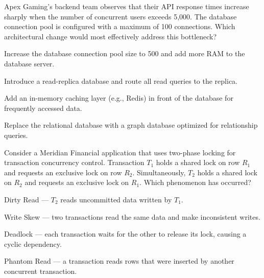 \documentclass[11pt,a4paper]{article}
\begin{document}
\begin{questionblock}
 Apex Gaming's backend team observes that their API response times increase sharply when the number of concurrent users exceeds 5,000. The database connection pool is configured with a maximum of 100 connections. Which architectural change would most effectively address this bottleneck?
\begin{mcoptions}
  \item[\textbf{A.}] Increase the database connection pool size to 500 and add more RAM to the database server.
  \item[\textbf{B.}] Introduce a read-replica database and route all read queries to the replica.
  \item[\textbf{C.}] Add an in-memory caching layer (e.g., Redis) in front of the database for frequently accessed data.
  \item[\textbf{D.}] Replace the relational database with a graph database optimized for relationship queries.
\end{mcoptions}
\end{questionblock}

\begin{questionblock}
 Consider a Meridian Financial application that uses two-phase locking for transaction concurrency control. Transaction $T_1$ holds a shared lock on row $R_1$ and requests an exclusive lock on row $R_2$. Simultaneously, $T_2$ holds a shared lock on $R_2$ and requests an exclusive lock on $R_1$. Which phenomenon has occurred?
\begin{mcoptions}
  \item[\textbf{A.}] Dirty Read --- $T_2$ reads uncommitted data written by $T_1$.
  \item[\textbf{B.}] Write Skew --- two transactions read the same data and make inconsistent writes.
  \item[\textbf{C.}] Deadlock --- each transaction waits for the other to release its lock, causing a cyclic dependency.
  \item[\textbf{D.}] Phantom Read --- a transaction reads rows that were inserted by another concurrent transaction.
\end{mcoptions}
\end{questionblock}

\vspace{16pt}
\end{document}
